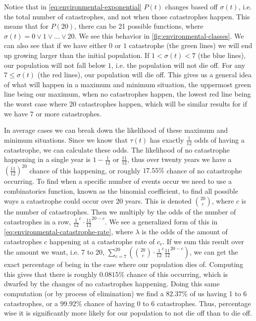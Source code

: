 \documentclass{article}
\begin{document}
Notice that in \cref{eq:environmental-exponential} $P(t)$ changes based off $\sigma(t)$, i.e. the total number of catastrophes, and not when those catastrophes happen. This means that for $P(20)$, there can be 21 possible functions, where $\sigma(t) = 0 \lor 1 \lor \ldots \lor 20$. We see this behavior in \cref{fig:environmental-classes}. We can also see that if we have either $0$ or $1$ catastrophe (the green lines) we will end up growing larger than the initial population. If $1 < \sigma(t) < 7$ (the blue lines), our population will not fall below $1$, i.e. the population will not die off. For any $7 \le \sigma(t)$ (the red lines), our population will die off. This gives us a general idea of what will happen in a maximum and minimum situation, the uppermost green line being our maximum, when no catastrophes happen, the lowest red line being the worst case where 20 catastrophes happen, which will be similar results for if we have 7 or more catastrophes.

In average cases we can break down the likelihood of these maximum and minimum situations. Since we know that $\tau(t)$ has exactly $\frac{1}{12}$ odds of having a catastrophe, we can calculate these odds. The likelihood of no catastrophe happening in a single year is $1 - \frac{1}{12}$ or $\frac{11}{12}$, thus over twenty years we have a $\left(\frac{11}{12}\right)^{20}$ chance of this happening, or roughly $17.55\%$ chance of no catastrophe occurring. To find when a specific number of events occur we need to use a combinatorics function, known as the binomial coefficient, to find all possible ways a catastrophe could occur over 20 years. This is denoted $\binom{20}{c}$, where $c$ is the number of catastrophes. Then we multiply by the odds of the number of catastrophes in a row, $\frac{1}{12}^c \cdot \frac{11}{12}^{20-c}$. We see a generalized form of this in \cref{eq:environmental-catastrophe-rate}, where $\lambda$ is the odds of the amount of catastrophes $c$ happening at a catastrophe rate of $c_r$. If we sum this result over the amount we want, i.e. 7 to 20, $\sum_{c=7}^{20}\left(\binom{20}{c} \cdot \frac{1}{12}^c \frac{11}{12}^{20-c}\right)$, we can get the exact percentage of being in the case where our population dies of. Computing this gives that there is roughly $0.0815\%$ chance of this occurring, which is dwarfed by the changes of no catastrophes happening. Doing this same computation (or by process of elimination) we find a $82.37\%$ of us having 1 to 6 catastrophes, or a $99.92\%$ chance of having 0 to 6 catastrophes. Thus, percentage wise it is significantly more likely for our population to not die off than to die off.
\end{document}
